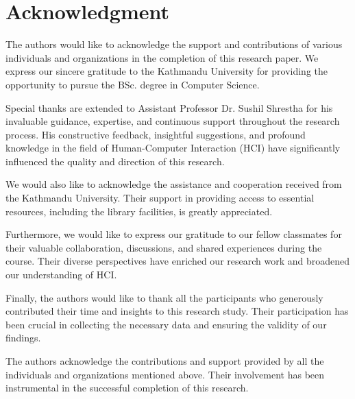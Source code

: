 \documentclass[journal]{IEEEtran}
\begin{document}
\section*{Acknowledgment}
The authors would like to acknowledge the support and contributions of various
individuals and organizations in the completion of this research paper. We
express our sincere gratitude to the Kathmandu University for providing the
opportunity to pursue the BSc. degree in Computer Science.

Special thanks are extended to Assistant Professor Dr. Sushil Shrestha for
his invaluable guidance, expertise, and continuous support throughout the
research process. His constructive feedback, insightful suggestions, and
profound knowledge in the field of Human-Computer Interaction (HCI) have
significantly influenced the quality and direction of this research.

We would also like to acknowledge the assistance and cooperation received
from the  Kathmandu University. Their support in providing access to essential
resources, including the library facilities, is greatly appreciated.

Furthermore, we would like to express our gratitude to our fellow classmates
for their valuable collaboration, discussions, and shared experiences during
the course. Their diverse perspectives have enriched our research work and
broadened our understanding of HCI.

Finally, the authors would like to thank all the participants who generously
contributed their time and insights to this research study. Their participation
has been crucial in collecting the necessary data and ensuring the validity of
our findings.

The authors acknowledge the contributions and support provided by all the
individuals and organizations mentioned above. Their involvement has been
instrumental in the successful completion of this research.

\ifCLASSOPTIONcaptionsoff
    \newpage
\fi



\end{document}
